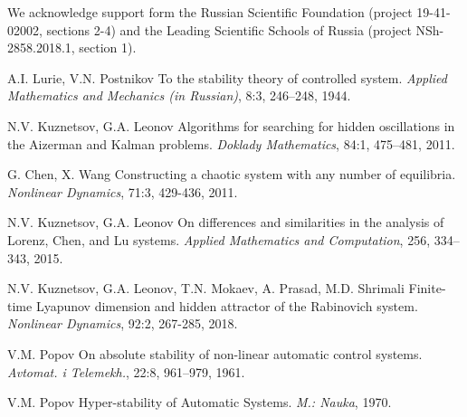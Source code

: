 \documentclass{ifacconf}
\theoremstyle{plain}
\begin{document}
\begin{ack}
We acknowledge support form
the Russian Scientific Foundation (project 19-41-02002, sections 2-4) and
the Leading Scientific Schools of Russia (project NSh-2858.2018.1, section 1).
\end{ack}

%

 

 \begin{thebibliography}{xx}  %

 A.I. Lurie, V.N. Postnikov
 \newblock To the stability theory of controlled system.
 \newblock \emph{Applied Mathematics and Mechanics (in Russian)}, 8:3, 246--248, 1944.

 N.V. Kuznetsov, G.A. Leonov
 \newblock Algorithms for searching for hidden oscillations in the Aizerman and Kalman problems.
 \newblock \emph{Doklady Mathematics}, 84:1, 475--481, 2011.

 G. Chen, X. Wang
 \newblock Constructing a chaotic system with any number of equilibria.
 \newblock \emph{Nonlinear Dynamics}, 71:3, 429-436, 2011.

 N.V. Kuznetsov, G.A. Leonov
 \newblock On differences and similarities in the analysis of Lorenz, Chen, and Lu systems.
 \newblock \emph{Applied Mathematics and Computation}, 256, 334--343, 2015.

 N.V. Kuznetsov, G.A. Leonov, T.N. Mokaev, A. Prasad, M.D. Shrimali
 \newblock Finite-time Lyapunov dimension and hidden attractor of the Rabinovich system.
 \newblock \emph{Nonlinear Dynamics}, 92:2, 267-285, 2018.

 V.M. Popov
 \newblock On absolute stability of non-linear automatic control systems.
 \newblock \emph{Avtomat. i Telemekh.}, 22:8, 961--979, 1961.

 V.M. Popov
 \newblock Hyper-stability of Automatic Systems.
 \newblock \emph{M.: Nauka}, 1970.


\end{thebibliography}
\end{document}
